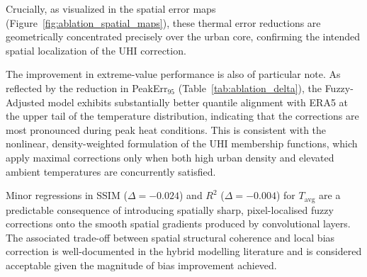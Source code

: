 \documentclass[conference]{IEEEtran}
\begin{document}
\begin{table}[htbp]
\centering
\caption{Relative change in performance metrics introduced by the Fuzzy Physics Engine ($\Delta = \mathrm{Fuzzy} - \mathrm{Baseline}$). $\Delta$\,Bias reports the absolute reduction in systematic error.}
\label{tab:ablation_delta}
\end{table}

Crucially, as visualized in the spatial error maps (Figure~\ref{fig:ablation_spatial_maps}), these thermal error reductions are geometrically concentrated precisely over the urban core, confirming the intended spatial localization of the UHI correction.

The improvement in extreme-value performance is also of particular note. As reflected by the reduction in PeakErr$_{95}$ (Table~\ref{tab:ablation_delta}), the Fuzzy-Adjusted model exhibits substantially better quantile alignment with ERA5 at the upper tail of the temperature distribution, indicating that the corrections are most pronounced during peak heat 
conditions. This is consistent with the nonlinear, density-weighted formulation of 
the UHI membership functions, which apply maximal corrections only when both high 
urban density and elevated ambient temperatures are concurrently satisfied.

Minor regressions in SSIM ($\Delta = -0.024$) and $R^2$ ($\Delta = -0.004$) for 
$T_\mathrm{avg}$ are a predictable consequence of introducing spatially sharp, 
pixel-localised fuzzy corrections onto the smooth spatial gradients produced by 
convolutional layers. The associated trade-off between spatial structural coherence 
and local bias correction is well-documented in the hybrid modelling literature \cite{
bano2020deep} and is considered acceptable given the magnitude of bias improvement 
achieved.
\end{document}
